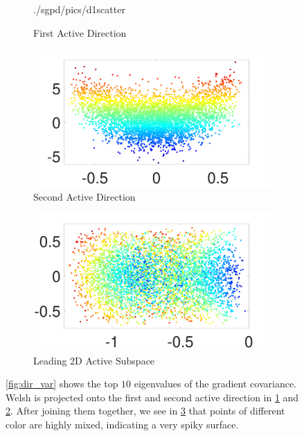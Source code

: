 \begin{figure}[ht]
\begin{center}
\begin{subfigure}{0.47\textwidth}
      {./sgpd/pics/d1scatter}
      \caption{First Active Direction}\label{fig:d1_sca}
    \end{subfigure}
    \begin{subfigure}{0.47\textwidth}
      \centering
      \captionsetup{justification=centering}
      \includegraphics[width=\textwidth,trim=1cm .5cm 2.5cm 1.5cm,clip]
      {./sgpd/pics/d2scatter}
      \caption{Second Active Direction}\label{fig:d2_sca}
    \end{subfigure}
    \begin{subfigure}{0.47\textwidth}
      \centering
      \captionsetup{justification=centering}
      \includegraphics[width=\textwidth,trim=1cm .5cm 2.5cm 1.5cm,clip]
      {./sgpd/pics/jointscatter}
      \caption{Leading 2D Active Subspace}\label{fig:joint_sca}
    \end{subfigure}
    \caption{\cref{fig:dir_var} shows the top $10$ eigenvalues of the gradient
    covariance. Welsh is projected onto the first and second active direction in
    \ref{fig:d1_sca} and \ref{fig:d2_sca}. After joining them together, we see
    in \ref{fig:joint_sca} that points of different color are highly mixed, indicating a very spiky surface.} \label{fig:dim_red}
  \end{center}
\end{figure}

